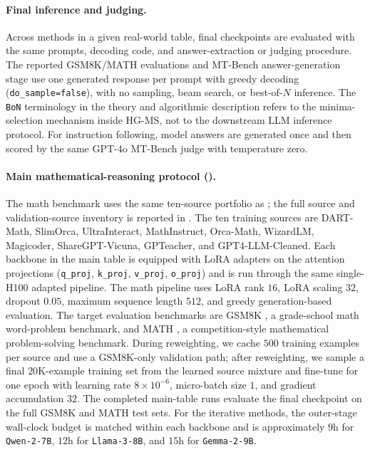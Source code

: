 \documentclass{article}
\theoremstyle{normaltheorem}
\newcommand{\BoN}{\texttt{BoN}\xspace}
\begin{document}
\paragraph{Final inference and judging.}
Across methods in a given real-world table, final checkpoints are evaluated with the same prompts, decoding code, and answer-extraction or judging procedure. The reported GSM8K/MATH evaluations and MT-Bench answer-generation stage use one generated response per prompt with greedy decoding (\texttt{do\_sample=false}), with no sampling, beam search, or best-of-\(N\) inference. The \BoN terminology in the theory and algorithmic description refers to the minima-selection mechanism inside \textsc{HG-MS}, not to the downstream LLM inference protocol. For instruction following, model answers are generated once and then scored by the same GPT-4o MT-Bench judge \citep{zheng2023judging} with temperature zero.

\paragraph{Main mathematical-reasoning protocol ().}
The math benchmark uses the same ten-source portfolio as \citet{pan2025scalebio}; the full source and validation-source inventory is reported in . The ten training sources are DART-Math, SlimOrca, UltraInteract, MathInstruct, Orca-Math, WizardLM, Magicoder, ShareGPT-Vicuna, GPTeacher, and GPT4-LLM-Cleaned. Each backbone in the main table is equipped with LoRA adapters on the attention projections (\texttt{q\_proj}, \texttt{k\_proj}, \texttt{v\_proj}, \texttt{o\_proj}) and is run through the same single-H100 adapted pipeline. The math pipeline uses LoRA rank $16$, LoRA scaling $32$, dropout $0.05$, maximum sequence length $512$, and greedy generation-based evaluation. The target evaluation benchmarks are GSM8K \citep{cobbe2021training}, a grade-school math word-problem benchmark, and MATH \citep{hendrycks2021measuring}, a competition-style mathematical problem-solving benchmark. During reweighting, we cache $500$ training examples per source and use a GSM8K-only validation path; after reweighting, we sample a final $20$K-example training set from the learned source mixture and fine-tune for one epoch with learning rate \(8\times 10^{-6}\), micro-batch size $1$, and gradient accumulation $32$. The completed main-table runs evaluate the final checkpoint on the full GSM8K and MATH test sets. For the iterative methods, the outer-stage wall-clock budget is matched within each backbone and is approximately $9$h for \texttt{Qwen-2-7B}, $12$h for \texttt{Llama-3-8B}, and $15$h for \texttt{Gemma-2-9B}.
\end{document}

